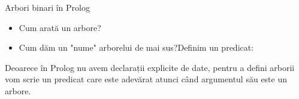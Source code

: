 \documentclass[xcolor=x11names,compress,10pt]{beamer}
\begin{document}
\begin{frame}{Arbori binari în Prolog}

\begin{itemize}
\item Cum arată un arbore? \pause

\begin{center}
\mbox{}
\end{center}

\bigskip\pause

\item Cum dăm un "nume" arborelui de mai sus?\pause   \quad Definim un predicat:

\begin{alltt}


\end{alltt}
\end{itemize}
\pause
\medskip

 Deoarece în  Prolog nu avem  declarații explicite de date, pentru a defini arborii vom scrie un predicat care este adevărat atunci când argumentul 
său este un arbore.
\end{frame}
\end{document}
